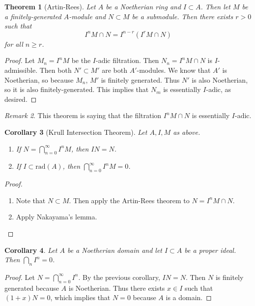 \documentclass[leqno, openany]{memoir}
\newtheorem{thm}{Theorem}[section]
\newtheorem{cor}[thm]{Corollary}
\theoremstyle{definition}
\theoremstyle{remark}
\newtheorem{rmk}[thm]{Remark}
\theoremstyle{plain}
\theoremstyle{definition}
\theoremstyle{remark}
\newcommand{\mr}[1]{\mathrm{#1}}
\begin{document}
\begin{thm}[Artin-Rees] Let $A$ be a Noetherian ring and $I \subset A$. Then
    let $M$ be a finitely-generated $A$-module and $N \subset M$ be a
    submodule. Then there exists $r > 0$ such that \[ I^n M \cap N = I^{n-r}
    (I^r M \cap N) \] for all $n \geq r$.  \end{thm}

\begin{proof} Let $M_n = I^n M$ be the $I$-adic filtration. Then $N_n = I^n M
    \cap N$ is $I$-admissible. Then both $N' \subset M'$ are both $A'$-modules.
    We know that $A'$ is Noetherian, so because $M_n$, $M'$ is finitely
    generated. Thus $N'$ is also Noetherian, so it is also finitely-generated.
    This implies that $N_m$ is essentially $I$-adic, as desired.  \end{proof}

\begin{rmk} This theorem is saying that the filtration $I^n M \cap N$ is
essentially $I$-adic.  \end{rmk}

\begin{cor}[Krull Intersection Theorem] Let $A, I, M$ as above.
\begin{enumerate} \item If $N = \bigcap_{n=0}^{\infty } I^n M$, then $IN = N$.
\item If $I \subset \mr{rad}(A)$, then $\bigcap_{n=0}^{\infty} I^n M = 0$.
\end{enumerate} \end{cor}

\begin{proof} \begin{enumerate} \item Note that $N \subset M$. Then apply the
Artin-Rees theorem to $N = I^n M \cap N$.  \item Apply Nakayama's lemma.
\qedhere \end{enumerate} \end{proof}

\begin{cor} Let $A$ be a Noetherian domain and let $I \subset A$ be a proper
ideal. Then $\bigcap_n I^n = 0$.  \end{cor}

\begin{proof} Let $N = \bigcap_{n=0}^{\infty} I^n$. By the previous corollary,
    $IN = N$. Then $N$ is finitely generated because $A$ is Noetherian. Thus
    there exists $x \in I$ such that $(1+x)N = 0$, which implies that $N = 0$
    because $A$ is a domain.  \end{proof}
\end{document}
